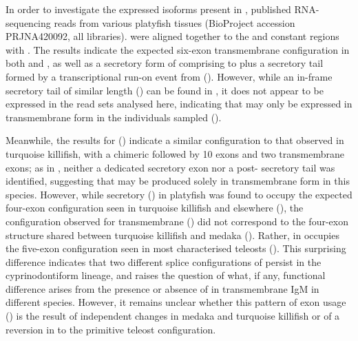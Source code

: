 In order to investigate the expressed isoforms present in \Xma, published RNA-sequencing reads from various platyfish tissues (BioProject accession PRJNA420092, all libraries). were aligned together to the  and  constant regions with . The results indicate the expected six-exon transmembrane configuration in both  and , as well as a secretory form of  comprising  to  plus a  secretory tail formed by a transcriptional run-on event from  (). However, while an in-frame secretory tail of similar length () can be found in , it does not appear to be expressed in the read sets analysed here, indicating that  may only be expressed in transmembrane form in the individuals sampled ().

Meanwhile, the results for  () indicate a similar configuration to that observed in turquoise killifish, with a chimeric  followed by 10 \cd{} exons and two transmembrane exons; as in \Nfu, neither a dedicated  secretory exon nor a post- secretory tail was identified, suggesting that  may be produced solely in transmembrane form in this species. However, while secretory  () in platyfish was found to occupy the expected four-exon configuration seen in turquoise killifish and elsewhere (), the configuration observed for transmembrane  () did not correspond to the four-exon structure shared between turquoise killifish and medaka (). Rather,  in \Xma occupies the five-exon configuration seen in most characterised teleosts (). This surprising difference indicates that two different splice configurations of  persist in the cyprinodontiform lineage, and raises the question of what, if any, functional difference arises from the presence or absence of  in transmembrane IgM in different species. However, it remains unclear whether this pattern of exon usage () is the result of independent changes in medaka and turquoise killifish or of a reversion in \Xma to the primitive teleost configuration.
	

